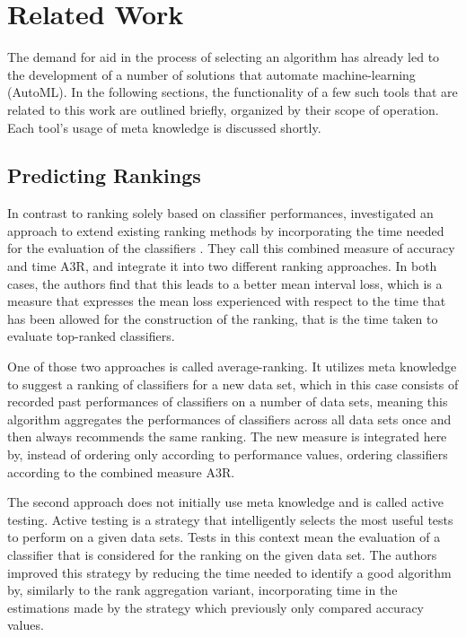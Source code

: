 \chapter{Related Work}
\label{sec:related}
The demand for aid in the process of selecting an algorithm has already led to the development of a number of solutions that automate machine-learning (AutoML). In the following sections, the functionality of a few such tools that are related to this work are outlined briefly, organized by their scope of operation. Each tool's usage of meta knowledge is discussed shortly.

\section{Predicting Rankings}
\label{sec:related:rankings}
In contrast to ranking solely based on classifier performances, \citeauthor{DBLP:journals/ml/AbdulrahmanBRV18} investigated an approach to extend existing ranking methods by incorporating the time needed for the evaluation of the classifiers \cite{DBLP:journals/ml/AbdulrahmanBRV18}. They call this combined measure of accuracy and time A3R, and integrate it into two different ranking approaches. In both cases, the authors find that this leads to a better mean interval loss, which is a measure that expresses the mean loss experienced with respect to the time that has been allowed for the construction of the ranking, that is the time taken to evaluate top-ranked classifiers. 

One of those two approaches is called average-ranking. It utilizes meta knowledge to suggest a ranking of classifiers for a new data set, which in this case consists of recorded past performances of classifiers on a number of data sets, meaning this algorithm aggregates the performances of classifiers across all data sets once and then always recommends the same ranking. The new measure is integrated here by, instead of ordering only according to performance values, ordering classifiers according to the combined measure A3R.

The second approach does not initially use meta knowledge and is called active testing. Active testing is a strategy that \textquotesingle intelligently selects the most useful tests\textquotesingle \cite{DBLP:journals/ml/AbdulrahmanBRV18} to perform on a given data sets. Tests in this context mean the evaluation of a classifier that is considered for the ranking on the given data set. The authors improved this strategy by reducing the time needed to identify a good algorithm by, similarly to the rank aggregation variant, incorporating time in the estimations made by the strategy which previously only compared accuracy values.


